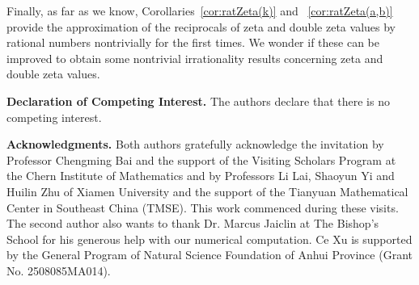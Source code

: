 \documentclass[11pt]{article}
\theoremstyle{plain}
\theoremstyle{definition}
\begin{document}
Finally, as far as we know, Corollaries~\ref{cor:ratZeta(k)} and ~\ref{cor:ratZeta(a,b)} provide the approximation of the reciprocals of zeta and double zeta values by rational numbers nontrivially for the first times. We wonder if these can be improved to obtain some nontrivial irrationality results concerning zeta and double zeta values.

\medskip\noindent
{\bf Declaration of Competing Interest.} The authors declare that there is no competing interest.

\medskip\noindent
{\bf Acknowledgments.} Both authors gratefully acknowledge the invitation by Professor Chengming Bai and the support of the Visiting Scholars Program at the Chern Institute of Mathematics and by Professors Li Lai, Shaoyun Yi and Huilin Zhu of Xiamen University and the support of the Tianyuan Mathematical Center in Southeast China (TMSE). This work commenced during these visits. The second author also wants to thank Dr. Marcus Jaiclin at The Bishop's School for his generous help with our numerical computation. Ce Xu is supported by the General Program of Natural Science Foundation of Anhui Province (Grant No. 2508085MA014).
\end{document}
